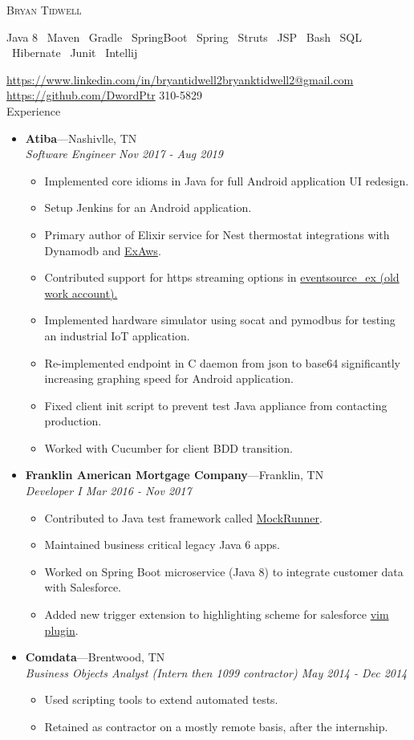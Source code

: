\documentclass[11pt,oneside]{article}
\makeatletter
\newcommand{\name}{Bryan Tidwell}
\newcommand{\email}{\href{mailto:bryanktidwell2@gmail.com}{bryanktidwell2@gmail.com}}
\newcommand{\phone}{615 310-5829}
\newcommand{\github}{\url{https://github.com/DwordPtr}}
\newcommand{\linkedin}{\url{https://www.linkedin.com/in/bryantidwell2}}
\newcommand{\bigname}[1]{
	\begin{center}\fontfamily{phv}\selectfont\LARGE\scshape#1\end{center}
}
\newenvironment{ressection}[1]{
	\vspace{4pt}
	{\fontfamily{phv}\selectfont\Large#1}
	\begin{itemize}
	\vspace{3pt}
}{
	\end{itemize}
}
\newcommand{\ressubitem}[1]{
	\vspace{-1pt}
	\item \begin{flushleft} #1 \end{flushleft}
}
\newcommand{\resbigitem}[3]{
	\vspace{-5pt}
	\item
	\textbf{#1}---#2 \\
	\textit{#3}
}
\newenvironment{ressubsec}[3]{
	\resbigitem{#1}{#2}{#3}
	\vspace{-2pt}
	\begin{itemize}
}{
	\end{itemize}
}
\makeatother
\begin{document}
 \selectfont

\bigname{\name}

\begin{center} Java 8 \textperiodcentered \ Maven \textperiodcentered \ Gradle \textperiodcentered 
        \ SpringBoot \textperiodcentered \ Spring \textperiodcentered \ Struts \textperiodcentered \ JSP \textperiodcentered \ Bash \textperiodcentered \ SQL  \textperiodcentered \ Hibernate \textperiodcentered \ Junit \textperiodcentered \ Intellij
\end{center}
\vspace{-1pt} {\small \linkedin \small \hfill \email} \\
\vspace{-1pt} {\small \github \small \hfill \ifdefined\unredacted \phone \fi} \\

\begin{ressection}{Experience}
        \begin{ressubsec}{Atiba}{Nashivlle, TN}{Software Engineer Nov 2017 - Aug 2019}
		\ressubitem{Implemented core idioms in Java for full Android application UI redesign.}
		\ressubitem{Setup Jenkins for an Android application.}
        \ressubitem{Primary author of Elixir service for Nest thermostat integrations with Dynamodb and \href{https://github.com/ex-aws/ex\_aws}{ExAws}.}
        \ressubitem{Contributed support for https streaming options in \href{https://github.com/cwc/eventsource_ex/pull/10/files}{eventsource\_ex (old work account).}}
        \ressubitem{Implemented hardware simulator using socat and pymodbus for testing an industrial IoT application.}
        \ressubitem{Re-implemented endpoint in C daemon from json to base64 significantly increasing graphing speed for Android application.}
		\ressubitem{Fixed client init script to prevent test Java appliance from contacting production.}
        \ressubitem{Worked with Cucumber for client BDD transition.}
	\end{ressubsec}

			\begin{ressubsec}{Franklin American Mortgage Company}{Franklin, TN}{Developer I Mar 2016 - Nov 2017}
                    \ressubitem{Contributed to Java test framework called \href{https://github.com/mockrunner/mockrunner/pull/42}{MockRunner}.}
		\ressubitem{Maintained business critical legacy Java 6 apps.}
        \ressubitem{Worked on Spring Boot microservice (Java 8) to integrate customer data with Salesforce.}
        \ressubitem{Added new trigger extension to highlighting scheme for salesforce \href{https://github.com/ejholmes/vim-forcedotcom/pull/13}{vim plugin}.}
	\end{ressubsec}

	\begin{ressubsec}{Comdata}{Brentwood, TN}{Business Objects Analyst (Intern then 1099 contractor) May 2014 - Dec 2014}
    \ressubitem{Used scripting tools to extend automated tests.}
    \ressubitem{Retained as contractor on a mostly remote basis, after the internship.}
	\end{ressubsec}

\end{ressection}
\end{document}
